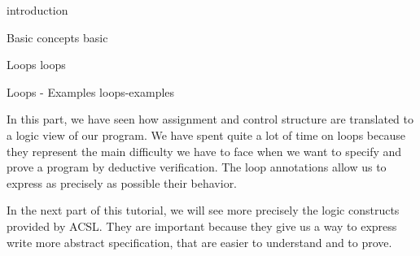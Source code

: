 \begin{levelTwo}
  {}
  {introduction}
\end{levelTwo}

\begin{levelTwo}
  {Basic concepts}
  {basic}
\end{levelTwo}

\begin{levelTwo}
  {Loops}
  {loops}
\end{levelTwo}

\begin{levelTwo}
  {Loops - Examples}
  {loops-examples}
\end{levelTwo}


\horizontalLine



In this part, we have seen how assignment and control structure are translated
to a logic view of our program. We have spent quite a lot of time on loops
because they represent the main difficulty we have to face when we want to
specify and prove a program by deductive verification. The loop annotations
allow us to express as precisely as possible their behavior.



In the next part of this tutorial, we will see more precisely the logic
constructs provided by ACSL. They are important because they give us a way to
express write more abstract specification, that are easier to understand and
to prove.
